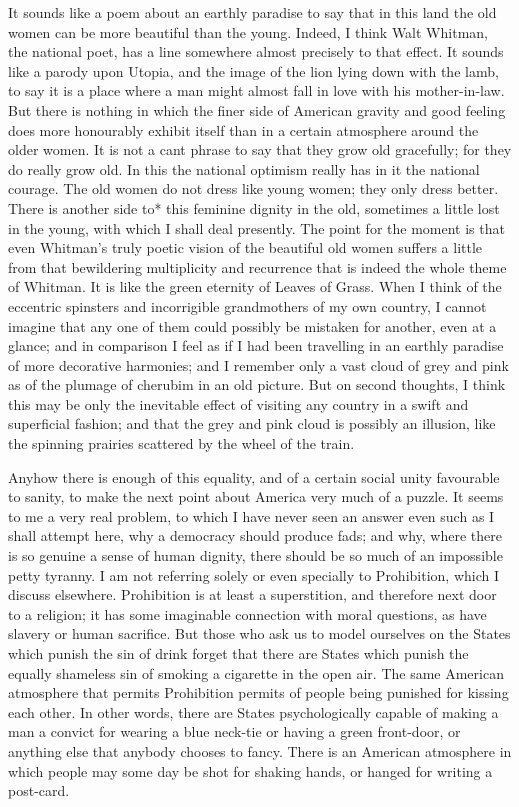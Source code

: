 \documentclass{book}
\begin{document}
It sounds like a poem about an earthly paradise to say that in this land the old women can be more beautiful than the young. Indeed, I think Walt Whitman, the national poet, has a line somewhere almost precisely to that effect. It sounds like a parody upon Utopia, and the image of the lion lying down with the lamb, to say it is a place where a man might almost fall in love with his mother-in-law. But there is nothing in which the finer side of American gravity and good feeling does more honourably exhibit itself than in a certain atmosphere around the older women. It is not a cant phrase to say that they grow old gracefully; for they do really grow old. In this the national optimism really has in it the national courage. The old women do not dress like young women; they only dress better. There is another side to* this feminine dignity in the old, sometimes a little lost in the young, with which I shall deal presently. The point for the moment is that even Whitman’s truly poetic vision of the beautiful old women suffers a little from that bewildering multiplicity and recurrence that is indeed the whole theme of Whitman. It is like the green eternity of Leaves of Grass. When I think of the eccentric spinsters and incorrigible grandmothers of my own country, I cannot imagine that any one of them could possibly be mistaken for another, even at a glance; and in comparison I feel as if I had been travelling in an earthly paradise of more decorative harmonies; and I remember only a vast cloud of grey and pink as of the plumage of cherubim in an old picture. But on second thoughts, I think this may be only the inevitable effect of visiting any country in a swift and superficial fashion; and that the grey and pink cloud is possibly an illusion, like the spinning prairies scattered by the wheel of the train.

Anyhow there is enough of this equality, and of a certain social unity favourable to sanity, to make the next point about America very much of a puzzle. It seems to me a very real problem, to which I have never seen an answer even such as I shall attempt here, why a democracy should produce fads; and why, where there is so genuine a sense of human dignity, there should be so much of an impossible petty tyranny. I am not referring solely or even specially to Prohibition, which I discuss elsewhere. Prohibition is at least a superstition, and therefore next door to a religion; it has some imaginable connection with moral questions, as have slavery or human sacrifice. But those who ask us to model ourselves on the States which punish the sin of drink forget that there are States which punish the equally shameless sin of smoking a cigarette in the open air. The same American atmosphere that permits Prohibition permits of people being punished for kissing each other. In other words, there are States psychologically capable of making a man a convict for wearing a blue neck-tie or having a green front-door, or anything else that anybody chooses to fancy. There is an American atmosphere in which people may some day be shot for shaking hands, or hanged for writing a post-card.
\end{document}
